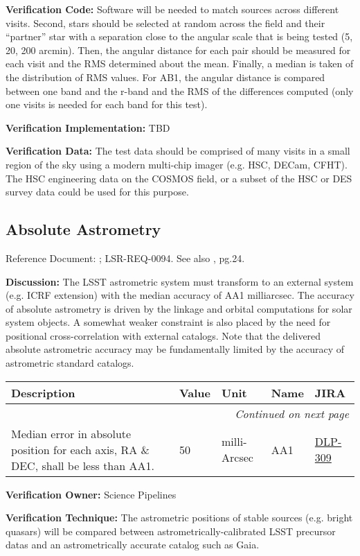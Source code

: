 \documentclass[DM,lsstdraft,toc]{lsstdoc}
\makeatletter
\newcommand{\jira}[1]{\href{https://jira.lsstcorp.org/browse/#1}{#1}}
\newenvironment{metric}[0]{%
\setlength\LTleft{0pt}
\setlength\LTright{\fill}
\begin{longtable}[]{@{}p{0.4\textwidth}lp{0.75in}p{1.3in}p{0.75in}@{}}

\hline \textbf{Description} & \textbf{Value} & \textbf{Unit} & \textbf{Name} & \textbf{JIRA} \\ \hline
\endhead

\hline \multicolumn{5}{r}{\emph{Continued on next page}} \\
\endfoot

\hline\hline
\endlastfoot
}{%
\hline
\end{longtable}
}
\makeatother
\begin{document}
\textbf{Verification Code:} Software will be needed to match sources
across different visits. Second, stars should be selected at random
across the field and their ``partner'' star with a separation close to
the angular scale that is being tested (5, 20, 200 arcmin). Then, the
angular distance for each pair should be measured for each visit and the
RMS determined about the mean. Finally, a median is taken of the
distribution of RMS values. For AB1, the angular distance is compared
between one band and the r-band and the RMS of the differences computed
(only one visits is needed for each band for this test).

\textbf{Verification Implementation:} TBD

\textbf{Verification Data:} The test data should be comprised of many
visits in a small region of the sky using a modern multi-chip imager
(e.g. HSC, DECam, CFHT). The HSC engineering data on the COSMOS field,
or a subset of the HSC or DES survey data could be used for this
purpose.

\subsection{Absolute Astrometry}\label{absolute-astrometry}

Reference Document: ; LSR-REQ-0094. See also \SRD, pg.24.

\textbf{Discussion:} The LSST astrometric system must transform to an
external system (e.g. ICRF extension) with the median accuracy of AA1
milliarcsec. The accuracy of absolute astrometry is driven by the
linkage and orbital computations for solar system objects. A somewhat
weaker constraint is also placed by the need for positional
cross-correlation with external catalogs. Note that the delivered
absolute astrometric accuracy may be fundamentally limited by the
accuracy of astrometric standard catalogs.

\begin{metric}
Median error in absolute position for each axis, RA \& DEC, shall be
less than AA1. & 50 & milli-Arcsec & AA1 & \jira{DLP-309}\tabularnewline
\end{metric}

\textbf{Verification Owner:} Science Pipelines

\textbf{Verification Technique:} The astrometric positions of stable
sources (e.g. bright quasars) will be compared between
astrometrically-calibrated LSST precursor datas and an astrometrically
accurate catalog such as Gaia.
\end{document}
